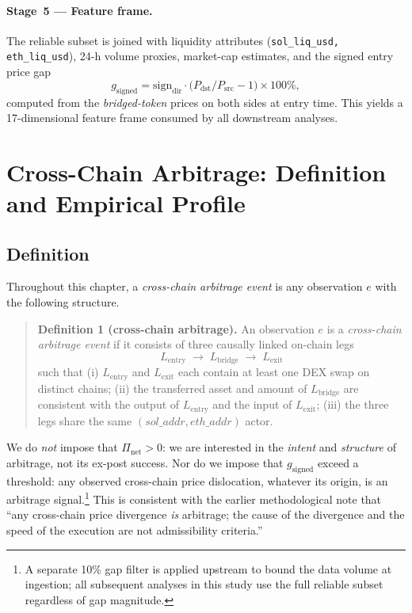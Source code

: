 \documentclass[sigconf,nonacm,10pt]{acmart}
\newcommand{\gsigned}{g_{\text{signed}}}
\begin{document}
\paragraph{Stage~5 --- Feature frame.} The reliable subset is joined with
liquidity attributes (\texttt{sol\_liq\_usd, eth\_liq\_usd}), 24-h volume
proxies, market-cap estimates, and the signed entry price gap
\begin{equation}
\label{eq:ch4-gsigned}
    \gsigned = \mathrm{sign}_{\text{dir}}\!\cdot\!
    \bigl(P_{\text{dst}}/P_{\text{src}}-1\bigr)\!\times\!100\%,
\end{equation}
computed from the \emph{bridged-token} prices on both sides at entry time.
This yields a 17-dimensional feature frame consumed by all downstream
analyses.

\section{Cross-Chain Arbitrage: Definition and Empirical Profile}
\label{sec:ch4-arbitrage}

\subsection{Definition}

Throughout this chapter, a \emph{cross-chain arbitrage event} is any
observation $e$ with the following structure.

\begin{quote}
\textbf{Definition 1 (cross-chain arbitrage).} An observation $e$ is a
\textit{cross-chain arbitrage event} if it consists of three causally
linked on-chain legs
\[
    L_{\text{entry}} \;\to\; L_{\text{bridge}} \;\to\; L_{\text{exit}}
\]
such that (i) $L_{\text{entry}}$ and $L_{\text{exit}}$ each contain at
least one DEX swap on distinct chains; (ii) the transferred asset and
amount of $L_{\text{bridge}}$ are consistent with the output of
$L_{\text{entry}}$ and the input of $L_{\text{exit}}$; (iii) the three legs
share the same $(sol\_addr, eth\_addr)$ actor.
\end{quote}

We do \emph{not} impose that $\Pi_{\text{net}} > 0$: we are interested in
the \emph{intent} and \emph{structure} of arbitrage, not its ex-post
success. Nor do we impose that $\gsigned$ exceed a threshold: any observed
cross-chain price dislocation, whatever its origin, is an arbitrage
signal.\footnote{A separate 10\% gap filter is applied upstream to bound
the data volume at ingestion; all subsequent analyses in this study use the
full reliable subset regardless of gap magnitude.} This is consistent with
the earlier methodological note that ``any cross-chain price divergence
\emph{is} arbitrage; the cause of the divergence and the speed of the
execution are not admissibility criteria.''
\end{document}
